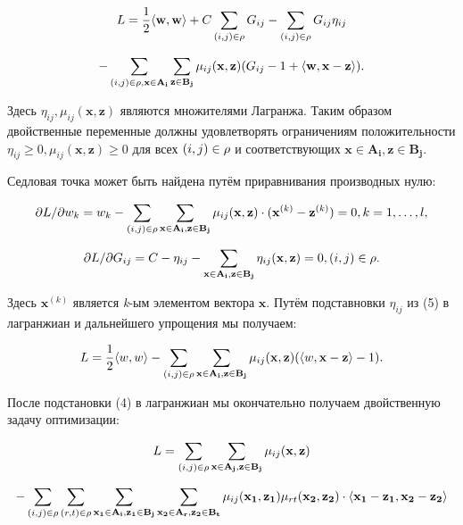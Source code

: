 \documentclass[12pt,a4paper,oneside]{article}
\begin{document}
\[
L = \frac{1}{2} \langle \mathbf{w}, \mathbf{w} \rangle + C \sum \limits_{(i, j) \in \mathrm{\rho}} G_{ij} - \sum \limits_{(i, j) \in \mathrm{\rho}} G_{ij} \eta_{ij}
\]

\[
- \sum \limits_{(i, j) \in \mathrm{\rho}, \mathbf{x} \in \mathbf{A_i}} \sum \limits_{\mathbf{z} \in \mathbf{B_j}} \mu_{ij}(\mathbf{x}, \mathbf{z}) (G_{ij} - 1 + \langle \mathbf{w}, \mathbf{x} - \mathbf{z} \rangle).
\]

\par
Здесь \(\eta_{ij}, \mu_{ij}(\mathbf{x}, \mathbf{z})\) являются множителями Лагранжа. 
Таким образом двойственные переменные должны удовлетворять ограничениям положительности \(\eta_{ij} \geq 0, \mu_{ij} (\mathbf{x}, \mathbf{z}) \geq 0\) для всех \((i, j) \in \mathrm{\rho}\) и соответствующих \(\mathbf{x} \in \mathbf{A_i}, \mathbf{z} \in \mathbf{B_j}\). 

\par
Седловая точка может быть найдена путём приравнивания производных нулю:

\[
\partial L / \partial w_k = w_k - \sum \limits_{(i, j) \in \mathrm{\rho}} \sum \limits_{\mathbf{x} \in \mathbf{A_i}, \mathbf{z} \in \mathbf{B_j}} \mu_{ij} (\mathbf{x}, \mathbf{z}) \cdot (\mathbf{x}^{(k)} - \mathbf{z}^{(k)}) = 0, k = 1, \dots, l,
\]

\[
\partial L / \partial G_{ij} = C - \eta_{ij} - \sum \limits_{\mathbf{x} \in \mathbf{A_i}, \mathbf{z} \in \mathbf{B_j}} \eta_{ij}(\mathbf{x}, \mathbf{z}) = 0, (i, j) \in \mathrm{\rho}. 
\]

\par
Здесь \(\mathbf{x}^{(k)}\) является \emph{k}-ым элементом вектора \(\mathbf{x}\). 
Путём подставновки \(\eta_{ij}\) из (5) в лагранжиан и дальнейшего упрощения мы получаем:

\[
L = \frac{1}{2} \langle w, w \rangle - \sum \limits_{(i, j) \in \mathrm{\rho}} \sum \limits_{\mathbf{x} \in \mathbf{A_i}, \mathbf{z} \in \mathbf{B_j}} \mu_{ij} (\mathbf{x}, \mathbf{z}) (\langle w, \mathbf{x} - \mathbf{z} \rangle - 1).
\]

\par
После подстановки (4) в лагранжиан мы окончательно получаем двойственную задачу оптимизации:

\[
L = \sum \limits_{(i, j) \in \mathrm{\rho}} \sum \limits_{\mathbf{x} \in \mathbf{A_j}, \mathbf{z} \in \mathbf{B_j}} \mu_{ij} (\mathbf{x}, \mathbf{z})
\]

\[
- \sum \limits_{(i, j) \in \mathrm{\rho}} \sum \limits_{(r, t) \in \mathrm{\rho}} \sum \limits_{\mathbf{x_1} \in \mathbf{A_i}, \mathbf{z_1} \in \mathbf{B_j}} \sum \limits_{\mathbf{x_2} \in \mathbf{A_r}, \mathbf{z_2} \in \mathbf{B_t}} \mu_{ij} (\mathbf{x_1}, \mathbf{z_1}) \mu_{rt} (\mathbf{x_2}, \mathbf{z_2}) \cdot \langle \mathbf{x_1} - \mathbf{z_1}, \mathbf{x_2} - \mathbf{z_2} \rangle
\]
\end{document}
